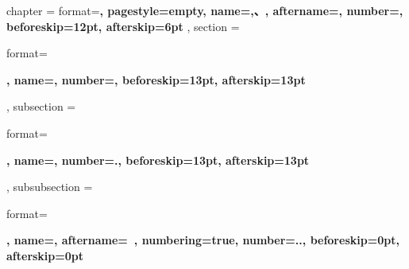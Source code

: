 \ctexset
{
    chapter =
    {
        format=\centering{}\bfseries,
        pagestyle=empty,
        name={,、},
        aftername=,
        number=,
        beforeskip=12pt,
        afterskip=6pt
    },
    section =
    {
        format=\raggedright{}\bfseries,
        name={},
        number=,
        beforeskip=13pt,
        afterskip=13pt
    },
    subsection =
    {
        format=\raggedright{}\bfseries,
        name={},
        number=.,
        beforeskip=13pt,
        afterskip=13pt
    },
    subsubsection =
    {
        format=\raggedright{}\bfseries,
        name={},
        aftername=~,
        numbering=true,
        number=..,
        beforeskip=0pt,
        afterskip=0pt
    }
}

\makeatletter
{}
\makeatother
